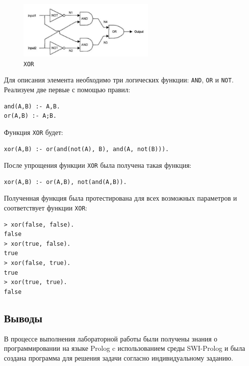 \begin{figure}[H]
    \centering
        \includegraphics[width=0.6\textwidth]{xor}
    \caption{\texttt{XOR}}
    \label{fig:xor}
\end{figure}

Для описания элемента необходимо три логических функции: \texttt{AND}, \texttt{OR} и \texttt{NOT}. Реализуем две первые с помощью правил:
\begin{lstlisting}
and(A,B) :- A,B.
or(A,B) :- A;B.
\end{lstlisting}

Функция \texttt{XOR} будет:
\begin{lstlisting}
xor(A,B) :- or(and(not(A), B), and(A, not(B))).
\end{lstlisting}

После упрощения функции \texttt{XOR} была получена такая функция:
\begin{lstlisting}
xor(A,B) :- or(A,B), not(and(A,B)).
\end{lstlisting}

Полученная функция была протестирована для всех возможных параметров и соответствует функции \texttt{XOR}:
\begin{lstlisting}
> xor(false, false).
false
> xor(true, false).
true
> xor(false, true).
true
> xor(true, true).
false
\end{lstlisting}


\subsection*{Выводы}
В процессе выполнения лабораторной работы были получены знания о программировании на языке Prolog c использованием среды SWI-Prolog и была создана программа для решения задачи согласно индивидуальному заданию.


